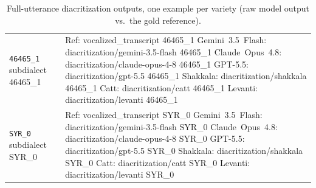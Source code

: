 \begin{table}[t]
\begin{tabular}{p{} p{}}
\addlinespace[4pt]
\texttt{46465\_1} \newline \scriptsize {{subdialect 46465_1}} & Ref: {{vocalized_transcript 46465_1}} \newline Gemini~3.5~Flash: {{diacritization/gemini-3.5-flash 46465_1}} \newline Claude~Opus~4.8: {{diacritization/claude-opus-4-8 46465_1}} \newline GPT-5.5: {{diacritization/gpt-5.5 46465_1}} \newline Shakkala: {{diacritization/shakkala 46465_1}} \newline Catt: {{diacritization/catt 46465_1}} \newline Levanti: {{diacritization/levanti 46465_1}} \\
\addlinespace[4pt]
\texttt{SYR\_0} \newline \scriptsize {{subdialect SYR_0}} & Ref: {{vocalized_transcript SYR_0}} \newline Gemini~3.5~Flash: {{diacritization/gemini-3.5-flash SYR_0}} \newline Claude~Opus~4.8: {{diacritization/claude-opus-4-8 SYR_0}} \newline GPT-5.5: {{diacritization/gpt-5.5 SYR_0}} \newline Shakkala: {{diacritization/shakkala SYR_0}} \newline Catt: {{diacritization/catt SYR_0}} \newline Levanti: {{diacritization/levanti SYR_0}} \\
\bottomrule
\end{tabular}
\caption{Full-utterance diacritization outputs, one example per variety (raw model output vs.\ the gold reference).}
\label{tab:diac-examples-full}
\end{table}
